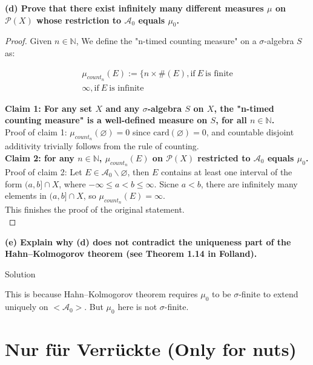 \textbf{(d) Prove that there exist infinitely many different measures \(\mu\) on \(\mathcal{P}(X)\) whose restriction to \(\mathcal{A}_{0}\) equals \(\mu_{0}\).}

\begin{proof}

Given \(n \in \mathbb{N}\), We define the "n-timed counting measure" on a \(\sigma\)-algebra \(S\) as:

\[\begin{matrix}
{\mu_{count_{n}}(E) := \{ n \times \#(E),\text{if}\ E\ \text{is finite}} \\
{\infty,\text{if}\ E\ \text{is infinite}}
\end{matrix}\]

\textbf{Claim 1: For any set \(X\) and any \(\sigma\)-algebra \(S\) on \(X\), the "n-timed counting measure" is a well-defined measure on \(S\), for all \(n \in \mathbb{N}\).}\\
Proof of claim 1: \(\mu_{count_{n}}(\varnothing) = 0\) since \(\text{card}(\varnothing) = 0\), and countable disjoint additivity trivially follows from the rule of counting.\\
\textbf{Claim 2: for any \(n \in \mathbb{N}\), \(\mu_{count_{n}}(E)\) on \(\mathcal{P}(X)\) restricted to \(\mathcal{A}_{0}\) equals \(\mu_{0}\).} Proof of claim 2: Let \(E \in \mathcal{A}_{0}\backslash\varnothing\), then \(E\) contains at least one interval of the form \((a,b\rbrack \cap X\), where \(- \infty \leq a < b \leq \infty\). Sicne \(a < b\), there are infinitely many elements in \((a,b\rbrack \cap X\), so \(\mu_{count_{n}}(E) = \infty\).\\
This finishes the proof of the original statement.\\

\end{proof}

\textbf{(e) Explain why (d) does not contradict the uniqueness part of the Hahn--Kolmogorov theorem (see Theorem 1.14 in Folland).}\\

\begin{qlsolution}{Solution}

This is because Hahn--Kolmogorov theorem requires \(\mu_{0}\) to be \(\sigma\)-finite to extend uniquely on \(< \mathcal{A}_{0} >\). But \(\mu_{0}\) here is not \(\sigma\)-finite.\\

\end{qlsolution}

\section{Nur für Verrückte (Only for nuts)}\label{nur-fuxfcr-verruxfcckte-only-for-nuts}

